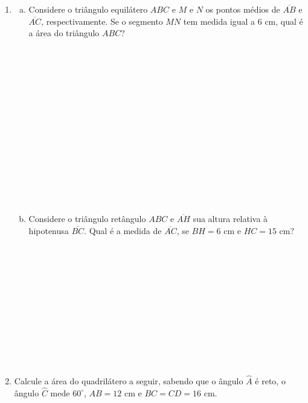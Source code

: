\documentclass[a4paper,14pt]{article}
\begin{document}
\begin{multicols}{2}
\begin{enumerate}
		    \item
		    \begin{enumerate}[a)]
		    	\item Considere o triângulo equilátero $ABC$ e $M$ e $N$ os pontos médios de $\overline{AB}$ e $\overline{AC}$, respectivamente. Se o segmento $MN$ tem medida igual a 6 cm, qual é a área do triângulo $ABC$? \\\\\\\\\\\\\\\\\\\\\\\\\\\\\\
		    	\item Considere o triângulo retângulo $ABC$ e $\overline{AH}$ sua altura relativa à hipotenusa $\overline{BC}$. Qual é a medida de $\overline{AC}$, se $BH = 6$ cm e $HC = 15$ cm? \\\\\\\\\\\\\\\\\\\\\\\\
		    \end{enumerate}
	        \item Calcule a área do quadrilátero a seguir, sabendo que o ângulo $\hat{A}$ é reto, o ângulo $\hat{C}$ mede $60^\circ$, $AB = 12$ cm e $BC = CD = 16$ cm.

\end{enumerate}
\end{multicols}
\end{document}
